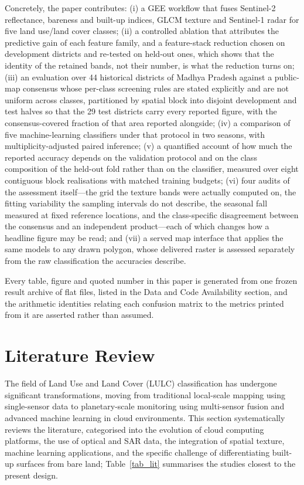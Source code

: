 \documentclass[conference]{IEEEtran}
\begin{document}
Concretely, the paper contributes: (i) a GEE workflow that fuses Sentinel-2 reflectance, bareness and built-up indices, GLCM texture and Sentinel-1 radar for five land use/land cover classes; (ii) a controlled ablation that attributes the predictive gain of each feature family, and a feature-stack reduction chosen on development districts and re-tested on held-out ones, which shows that the identity of the retained bands, not their number, is what the reduction turns on; (iii) an evaluation over 44 historical districts of Madhya Pradesh against a public-map consensus whose per-class screening rules are stated explicitly and are not uniform across classes, partitioned by spatial block into disjoint development and test halves so that the 29 test districts carry every reported figure, with the consensus-covered fraction of that area reported alongside; (iv) a comparison of five machine-learning classifiers under that protocol in two seasons, with multiplicity-adjusted paired inference; (v) a quantified account of how much the reported accuracy depends on the validation protocol and on the class composition of the held-out fold rather than on the classifier, measured over eight contiguous block realisations with matched training budgets; (vi) four audits of the assessment itself---the grid the texture bands were actually computed on, the fitting variability the sampling intervals do not describe, the seasonal fall measured at fixed reference locations, and the class-specific disagreement between the consensus and an independent product---each of which changes how a headline figure may be read; and (vii) a served map interface that applies the same models to any drawn polygon, whose delivered raster is assessed separately from the raw classification the accuracies describe.

Every table, figure and quoted number in this paper is generated from one frozen result archive of flat files, listed in the Data and Code Availability section, and the arithmetic identities relating each confusion matrix to the metrics printed from it are asserted rather than assumed.

\section{Literature Review}
The field of Land Use and Land Cover (LULC) classification has undergone significant transformations, moving from traditional local-scale mapping using single-sensor data to planetary-scale monitoring using multi-sensor fusion and advanced machine learning in cloud environments. This section systematically reviews the literature, categorised into the evolution of cloud computing platforms, the use of optical and SAR data, the integration of spatial texture, machine learning applications, and the specific challenge of differentiating built-up surfaces from bare land; Table~\ref{tab_lit} summarises the studies closest to the present design.
\end{document}
